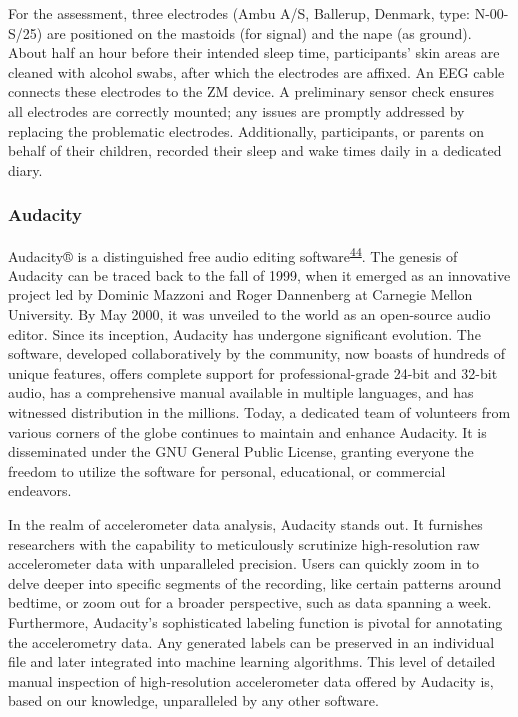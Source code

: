 \documentclass[
  9pt,
]{article}
\begin{document}
For the assessment, three electrodes (Ambu A/S, Ballerup, Denmark, type:
N-00-S/25) are positioned on the mastoids (for signal) and the nape (as
ground). About half an hour before their intended sleep time,
participants' skin areas are cleaned with alcohol swabs, after which the
electrodes are affixed. An EEG cable connects these electrodes to the ZM
device. A preliminary sensor check ensures all electrodes are correctly
mounted; any issues are promptly addressed by replacing the problematic
electrodes. Additionally, participants, or parents on behalf of their
children, recorded their sleep and wake times daily in a dedicated
diary.

\hypertarget{audacity}{%
\subsubsection{Audacity}\label{audacity}}

Audacity®️ is a distinguished free audio editing
software\textsuperscript{\protect\hyperlink{ref-audacity}{44}}. The
genesis of Audacity can be traced back to the fall of 1999, when it
emerged as an innovative project led by Dominic Mazzoni and Roger
Dannenberg at Carnegie Mellon University. By May 2000, it was unveiled
to the world as an open-source audio editor. Since its inception,
Audacity has undergone significant evolution. The software, developed
collaboratively by the community, now boasts of hundreds of unique
features, offers complete support for professional-grade 24-bit and
32-bit audio, has a comprehensive manual available in multiple
languages, and has witnessed distribution in the millions. Today, a
dedicated team of volunteers from various corners of the globe continues
to maintain and enhance Audacity. It is disseminated under the GNU
General Public License, granting everyone the freedom to utilize the
software for personal, educational, or commercial endeavors.

In the realm of accelerometer data analysis, Audacity stands out. It
furnishes researchers with the capability to meticulously scrutinize
high-resolution raw accelerometer data with unparalleled precision.
Users can quickly zoom in to delve deeper into specific segments of the
recording, like certain patterns around bedtime, or zoom out for a
broader perspective, such as data spanning a week. Furthermore,
Audacity's sophisticated labeling function is pivotal for annotating the
accelerometry data. Any generated labels can be preserved in an
individual file and later integrated into machine learning algorithms.
This level of detailed manual inspection of high-resolution
accelerometer data offered by Audacity is, based on our knowledge,
unparalleled by any other software.
\end{document}
